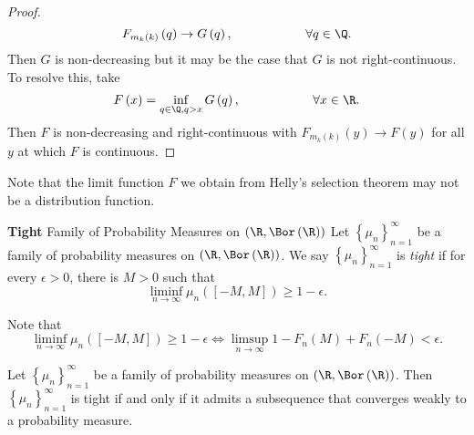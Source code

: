 \documentclass[stat901]{subfiles}
\begin{document}
\begin{proof}
        \begin{equation*}
            F_{m_k\left( k \right)}\left( q \right)\to G\left( q \right), \hspace{2cm}\forall q\in\Q.
        \end{equation*}
        Then $G$ is non-decreasing but it may be the case that $G$ is not right-continuous. To resolve this, take
        \begin{equation*}
            F\left( x \right) = \inf_{q\in\Q, q>x} G\left( q \right), \hspace{2cm}\forall x\in\R.
        \end{equation*}
        Then $F$ is non-decreasing and right-continuous with $F_{m_k\left( k \right)}\left( y \right)\to F\left( y \right)$ for all $y$ at which $F$ is continuous.
    \end{proof}

    \np Note that the limit function $F$ we obtain from Helly's selection theorem may not be a distribution function.

    \begin{definition}{\textbf{Tight} Family of Probability Measures on $\left( \R,\Bor\left( \R \right) \right)$}
        Let $\left\lbrace \mu_n \right\rbrace^{\infty}_{n=1}$ be a family of probability measures on $\left( \R,\Bor\left( \R \right) \right)$. We say $\left\lbrace \mu_n \right\rbrace^{\infty}_{n=1}$ is \emph{tight} if for every $\epsilon>0$, there is $M>0$ such that
        \begin{equation*}
            \liminf_{n\to\infty}\mu_n\left( \left[ -M,M \right] \right) \geq 1-\epsilon.
        \end{equation*}
    \end{definition}

    \np Note that
    \begin{equation*}
        \liminf_{n\to\infty}\mu_n\left( \left[ -M,M \right] \right) \geq 1-\epsilon \iff \limsup_{n\to\infty}1-F_n\left( M \right)+F_n\left( -M \right) < \epsilon.
    \end{equation*}

    \begin{theorem}{}
        Let $\left\lbrace \mu_n \right\rbrace^{\infty}_{n=1}$ be a family of probability measures on $\left( \R,\Bor\left( \R \right) \right)$. Then $\left\lbrace \mu_n \right\rbrace^{\infty}_{n=1}$ is tight if and only if it admits a subsequence that converges weakly to a probability measure.
    \end{theorem}
\end{document}
